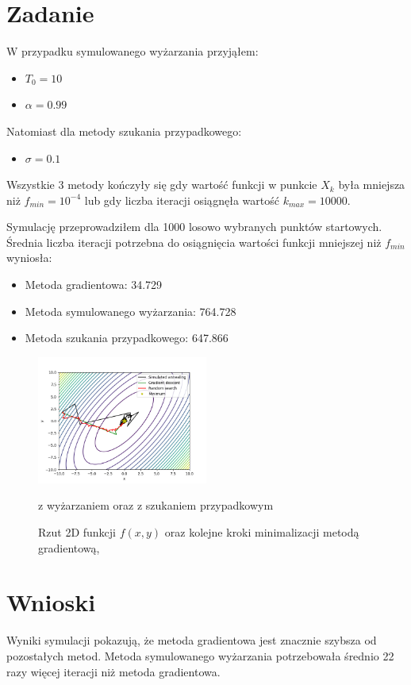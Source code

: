 \documentclass{article}
\begin{document}
\section{Zadanie}

W przypadku symulowanego wyżarzania przyjąłem:
\begin{itemize}
    \item $T_0 = 10$
    \item $\alpha = 0.99$
\end{itemize}

Natomiast dla metody szukania przypadkowego:
\begin{itemize}
    \item $\sigma = 0.1$
\end{itemize}

Wszystkie 3 metody kończyły się gdy wartość funkcji w punkcie $X_k$
była mniejsza niż $f_{min} = 10^{-4}$ lub gdy liczba iteracji
osiągnęła wartość $k_{max} = 10000$.

Symulację przeprowadziłem dla 1000 losowo wybranych punktów startowych.
Średnia liczba iteracji potrzebna do osiągnięcia wartości funkcji
mniejszej niż $f_{min}$ wyniosła:

\begin{itemize}
    \item Metoda gradientowa:  34.729
    \item Metoda symulowanego wyżarzania:  764.728
    \item Metoda szukania przypadkowego:  647.866
\end{itemize}

\begin{figure}[H]
    \centering
    \includegraphics[width=0.5\textwidth]{plot.png}
    \caption{Rzut 2D funkcji $f(x, y)$ oraz kolejne kroki
    minimalizacji metodą gradientową,} {z wyżarzaniem oraz 
    z szukaniem przypadkowym}
\end{figure}

\section{Wnioski}
Wyniki symulacji pokazują, że metoda gradientowa jest znacznie
szybsza od pozostałych metod. Metoda symulowanego wyżarzania
potrzebowała średnio 22 razy więcej iteracji niż metoda gradientowa.
\end{document}
